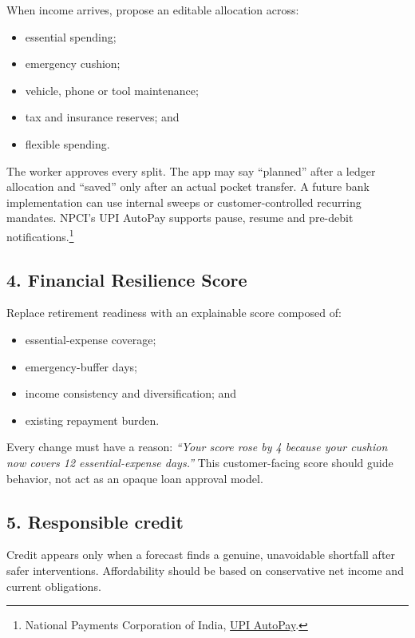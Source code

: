 \documentclass[10pt,a4paper]{article}
\begin{document}
When income arrives, propose an editable allocation across:

\begin{itemize}
  \item essential spending;
  \item emergency cushion;
  \item vehicle, phone or tool maintenance;
  \item tax and insurance reserves; and
  \item flexible spending.
\end{itemize}

The worker approves every split. The app may say ``planned'' after a ledger allocation and ``saved'' only after an actual pocket transfer. A future bank implementation can use internal sweeps or customer-controlled recurring mandates. NPCI's UPI AutoPay supports pause, resume and pre-debit notifications.\footnote{National Payments Corporation of India, \href{https://www.npci.org.in/product/autopay}{UPI AutoPay}.}

\subsection{4. Financial Resilience Score}

Replace retirement readiness with an explainable score composed of:

\begin{itemize}
  \item essential-expense coverage;
  \item emergency-buffer days;
  \item income consistency and diversification; and
  \item existing repayment burden.
\end{itemize}

Every change must have a reason: \emph{``Your score rose by 4 because your cushion now covers 12 essential-expense days.''} This customer-facing score should guide behavior, not act as an opaque loan approval model.

\subsection{5. Responsible credit}

Credit appears only when a forecast finds a genuine, unavoidable shortfall after safer interventions. Affordability should be based on conservative net income and current obligations.
\end{document}
